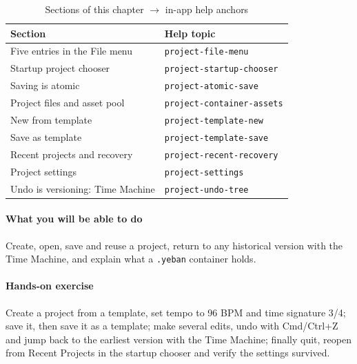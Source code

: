 \begin{table}[htbp]
\centering
\caption{Sections of this chapter $\to$ in-app help anchors}
\label{tab:ch02-help}
\begin{tabular}{ll}
\hline
Section & Help topic \\
\hline
Five entries in the File menu & \texttt{project-file-menu} \\
Startup project chooser & \texttt{project-startup-chooser} \\
Saving is atomic & \texttt{project-atomic-save} \\
Project files and asset pool & \texttt{project-container-assets} \\
New from template & \texttt{project-template-new} \\
Save as template & \texttt{project-template-save} \\
Recent projects and recovery & \texttt{project-recent-recovery} \\
Project settings & \texttt{project-settings} \\
Undo is versioning: Time Machine & \texttt{project-undo-tree} \\
\hline
\end{tabular}
\end{table}

\paragraph{What you will be able to do} Create, open, save and reuse a project, return to any historical version with the Time Machine, and explain what a \texttt{.yeban} container holds.

\paragraph{Hands-on exercise} Create a project from a template, set tempo to 96 BPM and time signature 3/4; save it, then save it as a template; make several edits, undo with Cmd/Ctrl+Z and jump back to the earliest version with the Time Machine; finally quit, reopen from Recent Projects in the startup chooser and verify the settings survived.
